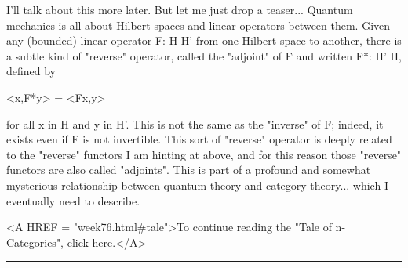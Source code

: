 I'll talk about this more later.  But let me just drop a teaser...
Quantum mechanics is all about Hilbert spaces and linear operators
between them.  Given any (bounded) linear operator F: H \to  H' from
one Hilbert space to another, there is a subtle kind of
"reverse" operator, called the "adjoint" of F and
written F*: H' \to  H, defined by

                      <x,F*y> = <Fx,y> 

for all x in H and y in H'.  This is not the same as the
"inverse" of F; indeed, it exists even if F is not invertible.
This sort of "reverse" operator is deeply related to the
"reverse" functors I am hinting at above, and for this reason
those "reverse" functors are also called "adjoints".
This is part of a profound and somewhat mysterious relationship between
quantum theory and category theory... which I eventually need to
describe.

<A HREF = "week76.html#tale">To continue reading the "Tale of
n-Categories", click here.</A>






\par\noindent\rule{\textwidth}{0.4pt}


